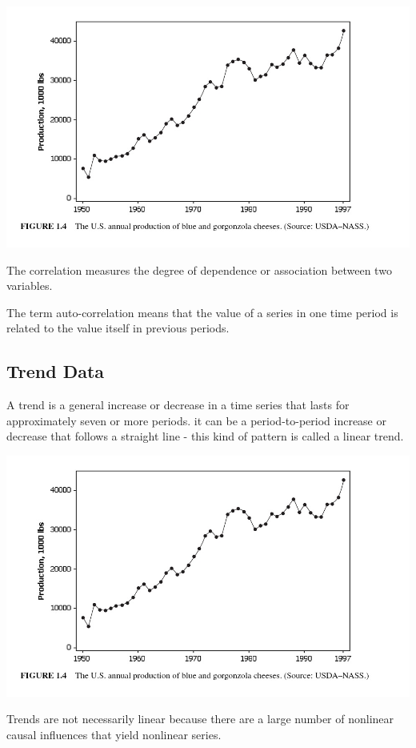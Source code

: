 \documentclass[
]{book}
\begin{document}
\begin{center}\includegraphics[width=0.8\linewidth]{img11/w11-Figure03} \end{center}

The correlation measures the degree of dependence or association between two variables.

The term auto-correlation means that the value of a series in one time period is related to the value itself in previous periods.

\hypertarget{trend-data}{%
\subsection{Trend Data}\label{trend-data}}

A trend is a general increase or decrease in a time series that lasts for approximately seven or more periods. it can be a period-to-period increase or decrease that follows a straight line - this kind of pattern is called a linear trend.

\begin{center}\includegraphics[width=0.8\linewidth]{img11/w11-Figure04} \end{center}

Trends are not necessarily linear because there are a large number of nonlinear causal influences that yield nonlinear series.
\end{document}
